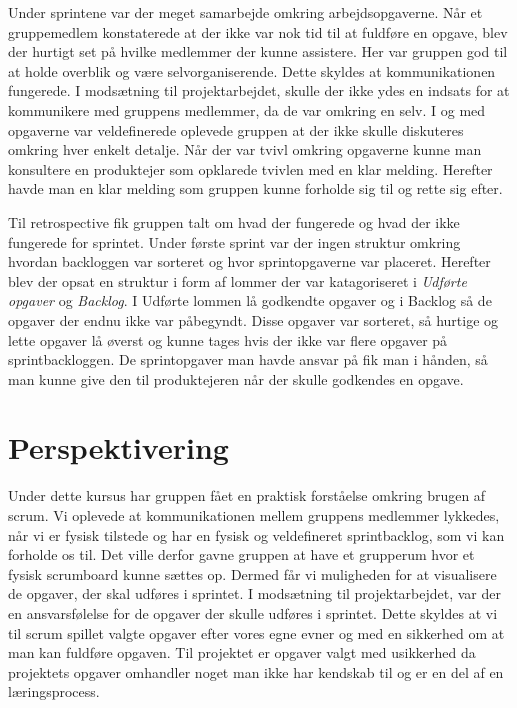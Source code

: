 Under sprintene var der meget samarbejde omkring arbejdsopgaverne. Når et gruppemedlem konstaterede at der ikke var nok tid til at fuldføre en opgave, blev der hurtigt set på hvilke medlemmer der kunne assistere. Her var gruppen god til at holde overblik og være selvorganiserende. Dette skyldes at kommunikationen fungerede. I modsætning til projektarbejdet, skulle der ikke ydes en indsats for at kommunikere med gruppens medlemmer, da de var omkring en selv. 
I og med opgaverne var veldefinerede oplevede gruppen at der ikke skulle diskuteres omkring hver enkelt detalje. Når der var tvivl omkring opgaverne kunne man konsultere en produktejer som opklarede tvivlen med en klar melding. Herefter havde man en klar melding som gruppen kunne forholde sig til og rette sig efter.  \newline

Til retrospective fik gruppen talt om hvad der fungerede og hvad der ikke fungerede for sprintet. Under første sprint var der ingen struktur omkring hvordan backloggen var sorteret og hvor sprintopgaverne var placeret. Herefter blev der opsat en struktur i form af lommer der var katagoriseret i \textit{Udførte opgaver} og \textit{Backlog}. I Udførte lommen lå godkendte opgaver og i Backlog så de opgaver der endnu ikke var påbegyndt. Disse opgaver var sorteret, så hurtige og lette opgaver lå øverst og kunne tages hvis der ikke var flere opgaver på sprintbackloggen. De sprintopgaver man havde ansvar på fik man i hånden, så man kunne give den til produktejeren når der skulle godkendes en opgave. \newline

\section{Perspektivering}
Under dette kursus har gruppen fået en praktisk forståelse omkring brugen af scrum. Vi oplevede at kommunikationen mellem gruppens medlemmer lykkedes, når vi er fysisk tilstede og har en fysisk og veldefineret sprintbacklog, som vi kan forholde os til. Det ville derfor gavne gruppen at have et grupperum hvor et fysisk scrumboard kunne sættes op. Dermed får vi muligheden for at visualisere de opgaver, der skal udføres i sprintet. \newline
I modsætning til projektarbejdet, var der en ansvarsfølelse for de opgaver der skulle udføres i sprintet. Dette skyldes at vi til scrum spillet valgte opgaver efter vores egne evner og med en sikkerhed om at man kan fuldføre opgaven. Til projektet er opgaver valgt med usikkerhed da projektets opgaver omhandler noget man ikke har kendskab til og er en del af en læringsprocess.

